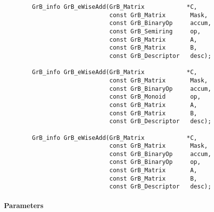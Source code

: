 \begin{verbatim}
        GrB_info GrB_eWiseAdd(GrB_Matrix            *C,
                              const GrB_Matrix       Mask,
                              const GrB_BinaryOp     accum,
                              const GrB_Semiring     op, 
                              const GrB_Matrix       A,
                              const GrB_Matrix       B,
                              const GrB_Descriptor   desc);
                            
        GrB_info GrB_eWiseAdd(GrB_Matrix            *C,
                              const GrB_Matrix       Mask,
                              const GrB_BinaryOp     accum,
                              const GrB_Monoid       op, 
                              const GrB_Matrix       A,
                              const GrB_Matrix       B,
                              const GrB_Descriptor   desc);
                            
        GrB_info GrB_eWiseAdd(GrB_Matrix            *C,
                              const GrB_Matrix       Mask,
                              const GrB_BinaryOp     accum,
                              const GrB_BinaryOp     op, 
                              const GrB_Matrix       A,
                              const GrB_Matrix       B,
                              const GrB_Descriptor   desc);
\end{verbatim}

\paragraph{Parameters}

